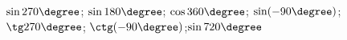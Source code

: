 \begin{ex}[type=calculate]
	\begin{condition}
		\( \sin270\degree \); \( \sin180\degree \); \( \cos360\degree \); \( \sin(-90\degree) \); \( \tg270\degree \); \( \ctg(-90\degree) \);\( \sin720\degree \)
	\end{condition}
\end{ex}